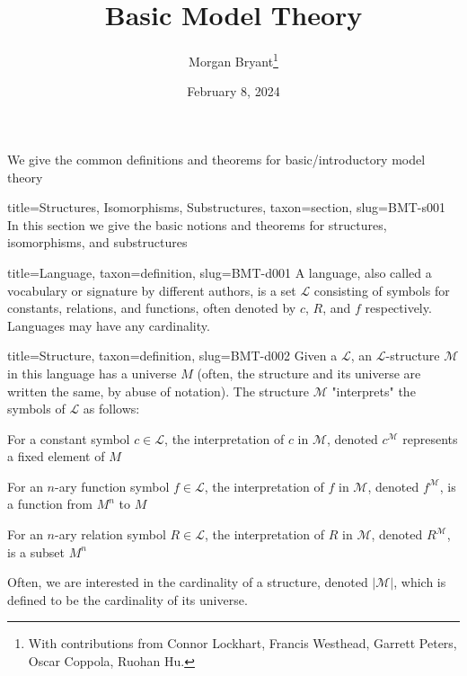 \documentclass[a4paper]{article}
\title{Basic Model Theory}
\date{February 8, 2024}
\author{Morgan Bryant\thanks{With contributions from Connor Lockhart, Francis Westhead, Garrett Peters, Oscar Coppola, Ruohan Hu.}}
\begin{document}
\maketitle
\par{We give the common definitions and theorems for basic/introductory model theory}
  
  
\begin{tree}{title={Structures, Isomorphisms, Substructures}, taxon={section}, slug={BMT-s001}}
In this section we give the basic notions and theorems for structures, isomorphisms, and substructures
\begin{tree}{title={Language}, taxon={definition}, slug={BMT-d001}}
A language, also called a vocabulary or signature by different authors, is a set \(\mathcal {L}\) consisting of symbols for constants, relations, and functions, 
often denoted by \(c\), \(R\), and \(f\) respectively. Languages may have any cardinality.
\end{tree}

\begin{tree}{title={Structure}, taxon={definition}, slug={BMT-d002}}
Given a  \(\mathcal {L}\), an \(\mathcal {L}\)-structure \(\mathcal {M}\) in this language has a universe \(M\) (often, the structure and its universe 
are written the same, by abuse of notation). The structure \(\mathcal {M}\) "interprets" the symbols of \(\mathcal {L}\) as follows:\par{For a constant symbol \(c \in   \mathcal {L}\), the interpretation of \(c\) in \(\mathcal {M}\), denoted \(c^{ \mathcal {M}}\) represents a fixed 
element of \(M\)}\par{For an \(n\)-ary function symbol \(f \in   \mathcal {L}\), the interpretation of \(f\) in \(\mathcal {M}\), denoted \(f^{ \mathcal {M}}\),
is a function from \(M^n\) to \(M\)}\par{For an \(n\)-ary relation symbol \(R \in   \mathcal {L}\), the interpretation of \(R\) in \(\mathcal {M}\), denoted \(R^{ \mathcal {M}}\),
is a subset \(M^n\)}\par{Often, we are interested in the cardinality of a structure, denoted \(| \mathcal {M}|\), which is defined to be the cardinality of its universe.}
\end{tree}


\end{tree}
\end{document}
